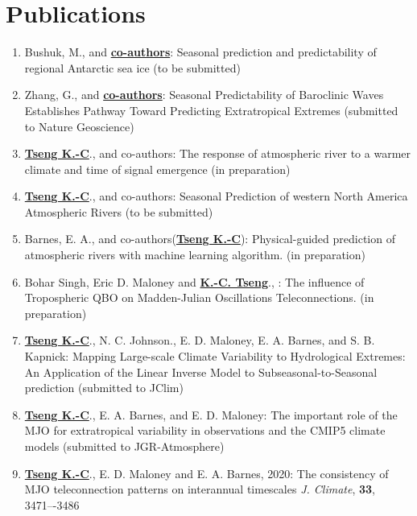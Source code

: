 \documentclass{article}
\begin{document}
\section{\color{airforceblue}Publications}
\begin{enumerate}
	\item Bushuk, M., and \normalsize{\bf{\underline{co-authors}}}: Seasonal prediction and predictability of regional Antarctic sea ice (to be submitted) \par
	\item Zhang, G., and \normalsize{\bf{\underline{co-authors}}}: Seasonal Predictability of Baroclinic Waves Establishes Pathway Toward Predicting Extratropical Extremes (submitted to Nature Geoscience) \par
	\item \normalsize{\bf{\underline{Tseng K.-C}}}., and co-authors: The response of atmospheric river to a warmer climate and time of signal emergence (in preparation) \par
    \item \normalsize{\bf{\underline{Tseng K.-C}}}., and co-authors: Seasonal Prediction of western North America Atmospheric Rivers (to be submitted)\par
	\item Barnes, E. A., and co-authors(\normalsize{\bf{\underline{Tseng K.-C}}}): Physical-guided prediction of atmospheric rivers with machine learning algorithm. (in preparation)  \par
	\item Bohar Singh, Eric D. Maloney and \normalsize{\bf{\underline{K.-C. Tseng}}}., : The influence of Tropospheric QBO on Madden-Julian Oscillations Teleconnections. (in preparation)  \par 
	\item \normalsize{\bf{\underline{Tseng K.-C}}}., N. C. Johnson., E. D. Maloney, E. A. Barnes, and S. B. Kapnick: Mapping Large-scale Climate Variability to Hydrological Extremes: An Application of the Linear Inverse Model to Subseasonal-to-Seasonal prediction (submitted to JClim) 	
	\item \normalsize{\bf{\underline{Tseng K.-C}}}., E. A. Barnes, and E. D. Maloney: The important role of the MJO for extratropical variability in observations and the CMIP5 climate models (submitted to JGR-Atmosphere)   
	\item \normalsize{\bf{\underline{Tseng K.-C}}}., E. D. Maloney and E. A. Barnes, 2020: The consistency of MJO teleconnection patterns on interannual timescales \textit{J. Climate}, \normalsize{\bf{33}}, 3471–-3486

\end{enumerate}
\end{document}
